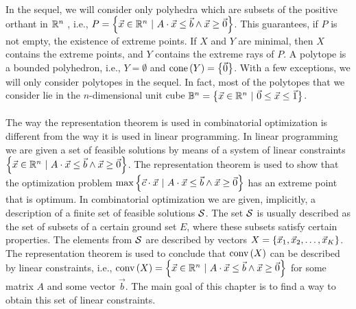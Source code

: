 \documentclass[titlepage]{book}
\theoremstyle{definition}
\begin{document}
\paragraph{}
In the sequel, we will consider only polyhedra which are subsets of the positive orthant in $\mathbb{R}^n$ , i.e., $P=\left\{ \vec{x}\in\mathbb{R}^n\ |\ A\cdot\vec{x}\leq\vec{b}\wedge\vec{x}\geq\vec{0} \right\}$. This guarantees, if $P$ is not empty, the existence of extreme points. If $X$ and $Y$ are minimal, then $X$ contains the extreme points, and $Y$ contains the extreme rays of $P$. A polytope is a bounded polyhedron, i.e., $Y=\emptyset$ and $\mbox{cone}\left( Y \right)=\left\{ \vec{0} \right\}$. With a few exceptions, we will only consider polytopes in the sequel. In fact, most of the polytopes that we consider lie in the $n$-dimensional unit cube $\mathbb{B}^n=\left\{ \vec{x}\in\mathbb{R}^n\ |\ \vec{0}\leq\vec{x}\leq\vec{1} \right\}$.

\paragraph{}
The way the representation theorem is used in combinatorial optimization is different from the way it is used in linear programming. In linear programming we are given a set of feasible solutions by means of a system of linear constraints $\left\{ \vec{x}\in\mathbb{R}^n\ |\ A\cdot\vec{x}\leq\vec{b}\wedge\vec{x}\geq\vec{0} \right\}$. The representation theorem is used to show that the optimization problem $\max\left\{ \vec{c}\cdot\vec{x}\ |\ A\cdot\vec{x}\leq\vec{b}\wedge\vec{x}\geq\vec{0} \right\}$ has an extreme point that is optimum. In combinatorial optimization we are given, implicitly, a description of a finite set of feasible solutions $\mathcal{S}$. The set $\mathcal{S}$ is usually described as the set of subsets of a certain ground set $E$, where these subsets satisfy certain properties. The elements from $\mathcal{S}$ are described by vectors $X=\left\{ \vec{x}_1,\vec{x}_2,\ldots,\vec{x}_K \right\}$. The representation theorem is used to conclude that $\mbox{conv}\left( X \right)$ can be described by linear constraints, i.e., $\mbox{conv}\left( X \right)=\left\{ \vec{x}\in\mathbb{R}^n\ |\ A\cdot\vec{x}\leq\vec{b}\wedge\vec{x}\geq\vec{0} \right\}$ for some matrix $A$ and some vector $\vec{b}$. The main goal of this chapter is to find a way to obtain this set of linear constraints.
\end{document}
